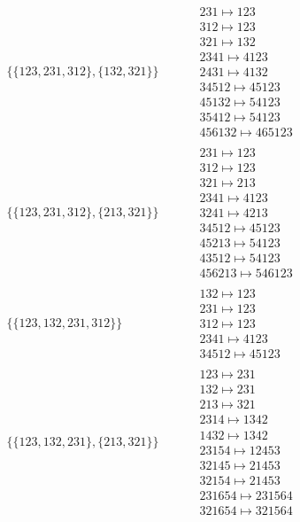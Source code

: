 \begin{tiny}
\begin{align}
\begin{matrix}
\end{matrix}
\\
\{\{123, 231, 312\}, \{132, 321\}\}
\quad
&
\phantom{.}
&
\begin{matrix}
231 \mapsto 123\\312 \mapsto 123\\321 \mapsto 132\\2341 \mapsto 4123\\2431 \mapsto 4132\\34512 \mapsto 45123\\45132 \mapsto 54123\\35412 \mapsto 54123\\456132 \mapsto 465123
\end{matrix}
\\
\{\{123, 231, 312\}, \{213, 321\}\}
\quad
&
\phantom{.}
&
\begin{matrix}
231 \mapsto 123\\312 \mapsto 123\\321 \mapsto 213\\2341 \mapsto 4123\\3241 \mapsto 4213\\34512 \mapsto 45123\\45213 \mapsto 54123\\43512 \mapsto 54123\\456213 \mapsto 546123
\end{matrix}
\\
\{\{123, 132, 231, 312\}\}
\quad
&
\phantom{.}
&
\begin{matrix}
132 \mapsto 123\\231 \mapsto 123\\312 \mapsto 123\\2341 \mapsto 4123\\34512 \mapsto 45123
\end{matrix}
\\
\{\{123, 132, 231\}, \{213, 321\}\}
\quad
&
\phantom{.}
&
\begin{matrix}
123 \mapsto 231\\132 \mapsto 231\\213 \mapsto 321\\2314 \mapsto 1342\\1432 \mapsto 1342\\23154 \mapsto 12453\\32145 \mapsto 21453\\32154 \mapsto 21453\\231654 \mapsto 231564\\321654 \mapsto 321564

\end{matrix}
\end{align}
\end{tiny}
